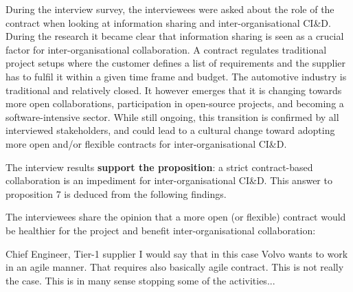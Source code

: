 During the interview survey, the interviewees were asked about the role of the contract when looking at information sharing and inter-organisational CI\&D. During the research it became clear that information sharing is seen as a crucial factor for inter-organisational collaboration. A contract regulates traditional project setups where the customer defines a list of requirements and the supplier has to fulfil it within a given time frame and budget. The automotive industry is traditional and relatively closed. It however emerges that it is changing towards more open collaborations, %
participation in open-source projects, and becoming a software-intensive sector. While still ongoing, this transition is confirmed by all interviewed stakeholders, and could lead to a cultural change toward adopting more open and/or flexible contracts for inter-organisational CI\&D.

The interview results {\bf support the proposition}: a strict contract-based collaboration is an impediment for inter-organisational CI\&D. This answer to proposition 7 is deduced from the following findings.


 The interviewees share the opinion that a more open (or flexible) contract would be healthier for the project and benefit inter-organisational collaboration: 

\begin{aquote}{Chief Engineer, Tier-1 supplier}
I would say that in this case Volvo wants to work in an agile manner. That requires also basically agile contract. This is not really the case. This is in many sense stopping some of the activities...
\end{aquote}
%
%
%


